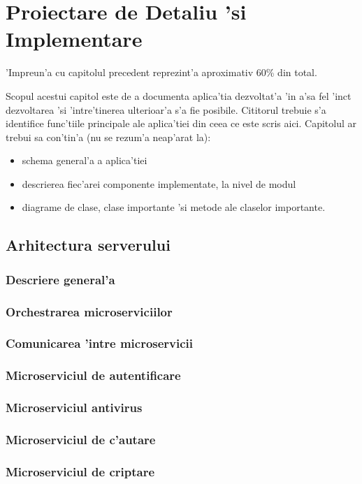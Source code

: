 \documentclass[12pt,a4paper,twoside]{report}
\begin{document}
\chapter{Proiectare de Detaliu 'si Implementare}

'Impreun'a cu capitolul precedent reprezint'a aproximativ 60\% din total.

Scopul acestui capitol este de a documenta aplica'tia dezvoltat'a 'in a'sa fel 'inc\ia t dezvoltarea 'si 'intre'tinerea ulterioar'a s'a fie posibile. 
Cititorul trebuie s'a identifice func'tiile principale ale aplica'tiei din ceea ce este scris aici.
Capitolul ar trebui sa con'tin'a (nu se rezum'a neap'arat la):
\begin{itemize}
 \item schema general'a a aplica'tiei
\item descrierea fiec'arei componente implementate, la nivel de modul
\item diagrame de clase, clase importante 'si metode ale claselor importante.
\end{itemize}
\section{Arhitectura serverului}
\subsection{Descriere general'a}
\subsection{Orchestrarea microserviciilor}
\subsection{Comunicarea 'intre microservicii}
\subsection{Microserviciul de autentificare}
\subsection{Microserviciul antivirus}
\subsection{Microserviciul de c'autare}
\subsection{Microserviciul de criptare}
\end{document}
